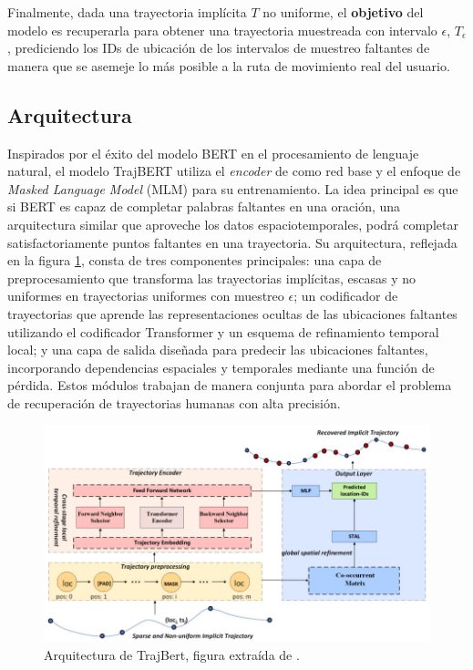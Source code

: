 Finalmente, dada una trayectoria implícita $T$ no uniforme, el \textbf{objetivo} del modelo es recuperarla para obtener una trayectoria muestreada con intervalo $\epsilon$, $T_\epsilon$, prediciendo los IDs de ubicación de los intervalos de muestreo faltantes de manera que se asemeje lo más posible a la ruta de movimiento real del usuario.

\subsection{Arquitectura}

Inspirados por el éxito del modelo BERT \cite{devlin2018bert} en el procesamiento de lenguaje natural, el modelo TrajBERT utiliza el \textit{encoder} de \cite{vaswani2017attention} como red base y el enfoque de \textit{Masked Language Model} (MLM) para su entrenamiento. La idea principal es que si BERT es capaz de completar palabras faltantes en una oración, una arquitectura similar que aproveche los datos espaciotemporales, podrá completar satisfactoriamente puntos faltantes en una trayectoria. Su arquitectura, reflejada en la figura \ref{fig:trajbert_architecture}, consta de tres componentes principales: una capa de preprocesamiento que transforma las trayectorias implícitas, escasas y no uniformes en trayectorias uniformes con muestreo $\epsilon$; un codificador de trayectorias que aprende las representaciones ocultas de las ubicaciones faltantes utilizando el codificador Transformer y un esquema de refinamiento temporal local; y una capa de salida diseñada para predecir las ubicaciones faltantes, incorporando dependencias espaciales y temporales mediante una función de pérdida. Estos módulos trabajan de manera conjunta para abordar el problema de recuperación de trayectorias humanas con alta precisión.

\begin{figure}[!htb] \centering \includegraphics[width=1\textwidth]{Graphics/trajbert_architecture.jpg} \caption{Arquitectura de TrajBert, figura extraída de \cite{si2023trajbert}.} \label{fig:trajbert_architecture} 
\end{figure}

